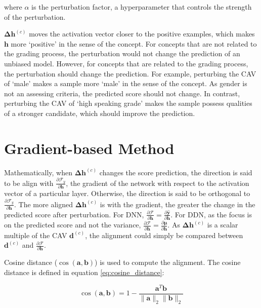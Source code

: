 where $\alpha$ is the perturbation factor, a hyperparameter that controls the strength of the perturbation.

$\boldsymbol{\Delta h}^{(c)}$ moves the activation vector closer to the positive examples, which makes $\boldsymbol{h}$ more `positive' in the sense of the concept. For concepts that are not related to the grading process, the perturbation would not change the prediction of an unbiased model. However, for concepts that are related to the grading process, the perturbation should change the prediction. For example, perturbing the CAV of `male' makes a sample more `male' in the sense of the concept. As gender is not an assessing criteria, the predicted score should not change. In contrast, perturbing the CAV of `high speaking grade' makes the sample possess qualities of a stronger candidate, which should improve the prediction.

\section{Gradient-based Method}

Mathematically, when $\boldsymbol{\Delta h}^{(c)}$ changes the score prediction, the direction is said to be align with $\frac{\partial \mathcal{F}_y}{\partial \boldsymbol{h}}$, the gradient of the network with respect to the activation vector of a particular layer.  Otherwise, the direction is said to be orthogonal to $\frac{\partial \mathcal{F}_y}{\partial \boldsymbol{h}}$. The more aligned $\boldsymbol{\Delta h}^{(c)}$ is with the gradient, the greater the change in the predicted score after perturbation. For DNN, $\frac{\partial \mathcal{F}}{\partial \boldsymbol{h}} = \frac{\partial \mathbf{\hat{y}}}{\partial \boldsymbol{h}}$. For DDN, as the focus is on the predicted score and not the variance, $\frac{\partial \mathcal{F}}{\partial \boldsymbol{h}} = \frac{\partial \mathbf{\mu}}{\partial \boldsymbol{h}}$. As $\boldsymbol{\Delta h}^{(c)}$ is a scalar multiple of the CAV $\boldsymbol{d}^{(c)}$, the alignment could simply be compared between $\boldsymbol{d}^{(c)}$ and $\frac{\partial \mathcal{F}}{\partial \boldsymbol{h}}$.

Cosine distance ($\cos(\boldsymbol{a}, \boldsymbol{b})$) is used to compute the alignment. The cosine distance is defined in equation \ref{eq:cosine_distance}:

\begin{equation} \label{eq:cosine_distance}
    \cos(\boldsymbol{a}, \boldsymbol{b}) = 1 - \frac{\boldsymbol{a}^T \boldsymbol{b}}{\|\boldsymbol{a}\|_2 \|\boldsymbol{b}\|_2}
\end{equation}

